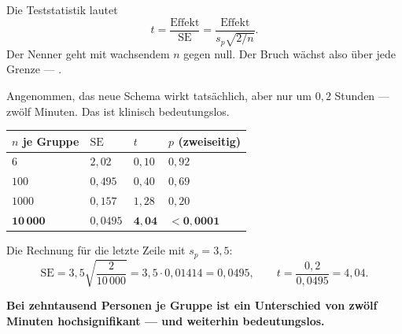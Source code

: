 \begin{warnung}
Die Teststatistik lautet
\[ t = \frac{\text{Effekt}}{\mathrm{SE}} = \frac{\text{Effekt}}{s_p\sqrt{2/n}} . \]
Der Nenner geht mit wachsendem $n$ gegen null. Der Bruch wächst also über jede Grenze --- .

Angenommen, das neue Schema wirkt tatsächlich, aber nur um $0{,}2$ Stunden --- zwölf Minuten. Das ist klinisch bedeutungslos.

\begin{center}
{\small
\renewcommand{\arraystretch}{1.48}
\begin{tabular}{@{}P{1.8cm}P{2.0cm}P{1.8cm}P{2.2cm}@{}}
\toprule
$n$ je Gruppe & $\mathrm{SE}$ & $t$ & $p$ (zweiseitig)\\
\midrule
$6$ & $2{,}02$ & $0{,}10$ & $0{,}92$\\
$100$ & $0{,}495$ & $0{,}40$ & $0{,}69$\\
$1000$ & $0{,}157$ & $1{,}28$ & $0{,}20$\\
$\mathbf{10\,000}$ & $0{,}0495$ & $\mathbf{4{,}04}$ & \textcolor{akzent}{$\mathbf{<0{,}0001}$}\\
\bottomrule
\end{tabular}}
\end{center}

Die Rechnung für die letzte Zeile mit $s_p = 3{,}5$:
\[ \mathrm{SE} = 3{,}5\sqrt{\frac{2}{10\,000}} = 3{,}5 \cdot 0{,}01414 = 0{,}0495, \qquad t = \frac{0{,}2}{0{,}0495} = 4{,}04 . \]

\begin{center}
\begin{minipage}{0.9\textwidth}
\textbf{Bei zehntausend Personen je Gruppe ist ein Unterschied von zwölf Minuten hochsignifikant --- und weiterhin bedeutungslos.}
\end{minipage}
\end{center}

\begin{center}
\begin{minipage}{0.88\textwidth}
\end{minipage}
\end{center}
\end{warnung}

